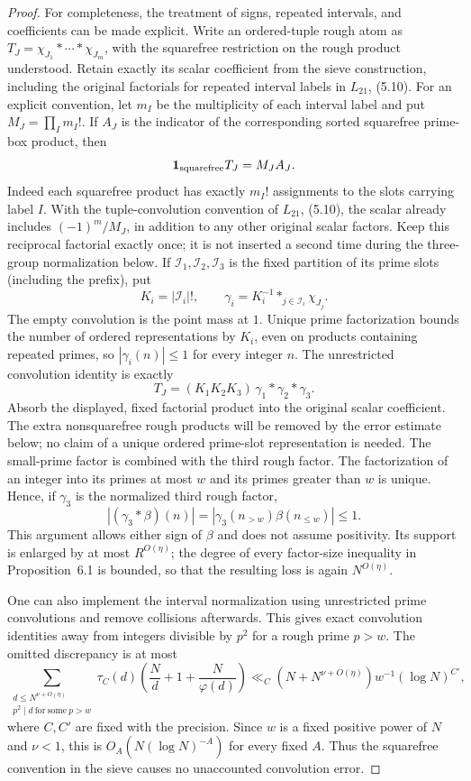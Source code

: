 \begin{proof}
For completeness, the treatment of signs, repeated intervals, and
coefficients can be made explicit. Write an ordered-tuple rough atom
as $T_J=\chi_{J_1}*\cdots*\chi_{J_m}$, with the squarefree restriction
on the rough product understood. Retain exactly its scalar
coefficient from the sieve construction, including the original
factorials for repeated interval labels in $L_{21}$, (5.10).
For an explicit convention, let $m_I$ be the multiplicity of each
interval label and put $M_J=\prod_I m_I!$. If $A_J$ is the indicator
of the corresponding sorted squarefree prime-box product, then
\begin{equation}\label{eq:box-symmetry-normalization}
 \mathbf1_{\rm squarefree}T_J=M_J A_J.
\end{equation}
Indeed each squarefree product has exactly $m_I!$ assignments to
the slots carrying label $I$. With the tuple-convolution convention
of $L_{21}$, (5.10), the scalar already includes
$(-1)^m/M_J$, in addition to any other original scalar factors.
Keep this reciprocal factorial exactly once; it is not inserted a
second time during the three-group normalization below.
If $\mathcal I_1,\mathcal I_2,\mathcal I_3$ is the fixed partition
of its prime slots (including the prefix), put
\[
 K_i=|\mathcal I_i|!,\qquad
 \gamma_i=K_i^{-1}\mathop{*}_{j\in\mathcal I_i}\chi_{J_j}.
\]
The empty convolution is the point mass at $1$. Unique prime
factorization bounds the number of ordered representations by
$K_i$, even on products containing repeated primes, so
$|\gamma_i(n)|\le1$ for every integer $n$. The unrestricted
convolution identity is exactly
\[
 T_J=(K_1K_2K_3)\,\gamma_1*\gamma_2*\gamma_3.
\]
Absorb the displayed, fixed factorial product into the original
scalar coefficient. The extra nonsquarefree rough products will
be removed by the error estimate below; no claim of a unique
ordered prime-slot representation is needed.
The small-prime factor is combined with the third rough factor.
The factorization of an integer into its primes
at most $w$ and its primes greater than $w$ is unique. Hence, if
$\gamma_3$ is the normalized third rough factor,
\[
 |(\gamma_3*\beta)(n)|
 =|\gamma_3(n_{>w})\beta(n_{\le w})|\le1.
\]
This argument allows either sign of $\beta$ and does not assume
positivity. Its support is enlarged by at most $R^{O(\eta)}$;
the degree of every factor-size inequality in Proposition~6.1 is
bounded, so that the resulting loss is again $N^{O(\eta)}$.

One can also implement the interval normalization using unrestricted
prime convolutions and remove collisions afterwards. This gives
exact convolution identities away from integers divisible by
$p^2$ for a rough prime $p>w$. The omitted discrepancy is at most
\[
 \sum_{\substack{d\le N^{\nu+O(\eta)}\\
                  p^2\mid d\ \mathrm{for\ some}\ p>w}}
   \tau_C(d)\left(\frac{N}{d}+1+\frac{N}{\varphi(d)}\right)
 \ll_C (N+N^{\nu+O(\eta)})w^{-1}(\log N)^{C'},
\]
where $C,C'$ are fixed with the precision. Since $w$ is a fixed
positive power of $N$ and $\nu<1$, this is
$O_A(N(\log N)^{-A})$ for every fixed $A$. Thus the squarefree
convention in the sieve causes no unaccounted convolution error.


\end{proof}
